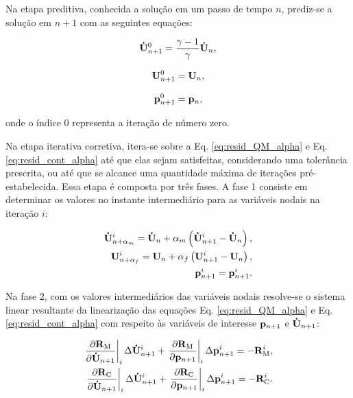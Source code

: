 \documentclass[tese_patricia]{subfiles}%
\begin{document}
Na etapa preditiva, conhecida a solução em um passo de tempo $n$, prediz-se a solução em $n+1$ com as seguintes equações:

\begin{align}
\mathbf{\dot{U}}_{n+1}^{0} = \frac{\gamma-1}{\gamma}\mathbf{\dot{U}}_{n} \label{eq:pred_acel},
\end{align}

\begin{align}
\mathbf{U}_{n+1}^{0} = \mathbf{U}_{n}, \label{eq:pred_vel}
\end{align}

\begin{align}
\mathbf{p}_{n+1}^{0} = \mathbf{p}_{n},\label{eq:pred_press}
\end{align}

\noindent onde o índice $0$ representa a iteração de número zero. 

Na etapa iterativa corretiva, itera-se sobre a Eq. \eqref{eq:resid_QM_alpha} e Eq. \eqref{eq:resid_cont_alpha} até que elas sejam satisfeitas, considerando uma tolerância prescrita, ou até que se alcance uma quantidade máxima de iterações pré-estabelecida. Essa etapa é composta por três fases. A fase 1 consiste em determinar os valores no instante intermediário para as variáveis nodais na iteração $i$:

\begin{align}
\mathbf{\dot{U}}_{n+\alpha_m}^{i} = \mathbf{\dot{U}}_n + \alpha_m \left( \mathbf{\dot{U}}_{n+1}^{i} - \mathbf{\dot{U}}_n \right), \label{eq:inter_acel_i}\\
\mathbf{U}_{n+\alpha_f}^{i} = \mathbf{U}_n + \alpha_f \left( \mathbf{U}_{n+1}^{i} - \mathbf{U}_n \right), \label{eq:inter_vel_i}\\
\mathbf{p}_{n+1}^{i} = \mathbf{p}_{n+1}^{i} \label{eq:inter_press_i}.
\end{align}

Na fase 2, com os valores intermediários das variáveis nodais resolve-se o sistema linear resultante da linearização das equações Eq. \eqref{eq:resid_QM_alpha} e Eq. \eqref{eq:resid_cont_alpha} com respeito às variáveis de interesse $\mathbf{p}_{n+1}$ e $\mathbf{\dot{U}}_{n+1}$:

\begin{align}
\left .\frac{\partial\mathbf{R}_\mathrm{M}}{\partial\mathbf{\dot{U}}_{n+1}}\right|_{i} \Delta \mathbf{\dot{U}}_{n+1}^{i} + \left .\frac{\partial\mathbf{R}_\mathrm{M}}{\partial\mathbf{p}_{n+1}}\right|_{i} \Delta \mathbf{p}_{n+1}^{i} = -\mathbf{R}_\mathrm{M}^{i}, \label{eq:eq_lin_QM} \\
\left .\frac{\partial\mathbf{R}_\mathrm{C}}{\partial\mathbf{\dot{U}}_{n+1}}\right|_{i} \Delta \mathbf{\dot{U}}_{n+1}^{i} + \left .\frac{\partial\mathbf{R}_\mathrm{C}}{\partial\mathbf{p}_{n+1}}\right|_{i} \Delta \mathbf{p}_{n+1}^{i} = -\mathbf{R}_\mathrm{C}^{i}.\label{eq:eq_lin_cont}
\end{align}
\end{document}
